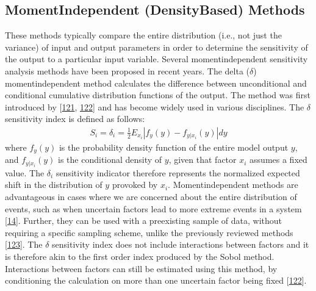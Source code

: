 \documentclass[letterpaper,10pt,english]{sphinxmanual}
\begin{document}
\subsection{Moment\sphinxhyphen{}Independent (Density\sphinxhyphen{}Based) Methods}
\label{\detokenize{3_sensitivity_analysis_the_basics:moment-independent-density-based-methods}}
\sphinxAtStartPar
These methods typically compare the entire distribution (i.e., not just the variance) of input and output parameters in order to determine the sensitivity of the output to a particular input variable. Several moment\sphinxhyphen{}independent sensitivity analysis methods have been proposed in recent years. The delta (\(\delta\)) moment\sphinxhyphen{}independent method calculates the difference between unconditional and conditional cumulative distribution functions of the output. The method was first introduced by {[}\hyperlink{cite.index:id142}{121}, \hyperlink{cite.index:id141}{122}{]} and has become widely used in various disciplines. The \(\delta\) sensitivity index is defined as follows:
\begin{equation*}
\begin{split}S_i=\delta_i=\frac{1}{2}E_{x_i}|f_y(y)-f_{y|x_i}(y)|dy\end{split}
\end{equation*}
\sphinxAtStartPar
where \(f_y(y)\) is the probability density function of the entire model output \(y\), and \(f_{y|x_i}(y)\) is the conditional density of \(y\), given that factor \(x_i\) assumes a fixed value. The \(\delta_i\) sensitivity indicator therefore represents the normalized expected shift in the distribution of \(y\) provoked by \(x_i\). Moment\sphinxhyphen{}independent methods are advantageous in cases where we are concerned about the entire distribution of events, such as when uncertain factors lead to more extreme events in a system {[}\hyperlink{cite.index:id47}{14}{]}. Further, they can be used with a pre\sphinxhyphen{}existing sample of data, without requiring a specific sampling scheme, unlike the previously reviewed methods {[}\hyperlink{cite.index:id143}{123}{]}. The \(\delta\) sensitivity index does not include interactions between factors and it is therefore akin to the first order index produced by the Sobol method. Interactions between factors can still be estimated using this method, by conditioning the calculation on more than one uncertain factor being fixed {[}\hyperlink{cite.index:id141}{122}{]}.
\end{document}
